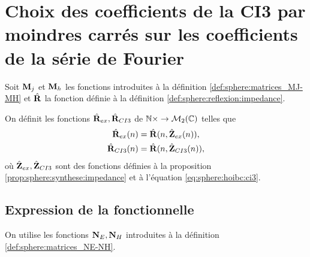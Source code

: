 \section[Choix 2 du calcul des coefficients de la CI3]{Choix des coefficients de la CI3 par moindres carrés sur les coefficients de la série de Fourier}

  Soit \(\mathbf{M}_j\) et \(\mathbf{M}_h\) les fonctions introduites à la définition \ref{def:sphere:matrices_MJ-MH} et \(\hat{\mathbf{R}}\) la fonction définie à la définition \ref{def:sphere:reflexion:impedance}.

  \begin{defn}%
    \label{def:sphere:minimisation:matrices_MR}
    On définit les fonctions \(\hat{\mathbf{R}}_{ex}, \hat{\mathbf{R}}_{CI3}\) de \(\mathbb N\times \rightarrow \mathcal{M}_2(\mathbb C)\) telles que
    \begin{align*}
      \hat{\mathbf{R}}_{ex}(n) &= \hat{\mathbf{R}}(n, \hat{\mathbf{Z}}_{ex}(n)),
      \\
      \hat{\mathbf{R}}_{CI3}(n) &= \hat{\mathbf{R}}(n, \hat{\mathbf{Z}}_{CI3}(n)),
    \end{align*}
    où \(\hat{\mathbf{Z}}_{ex},\hat{\mathbf{Z}}_{CI3}\) sont des fonctions définies à la proposition \ref{prop:sphere:synthese:impedance} et à l'équation \eqref{eq:sphere:hoibc:ci3}.
  \end{defn}

  \subsection{Expression de la fonctionnelle}

    On utilise les fonctions \(\mathbf{N}_E, \mathbf{N}_H\) introduites à la définition \ref{def:sphere:matrices_NE-NH}.

